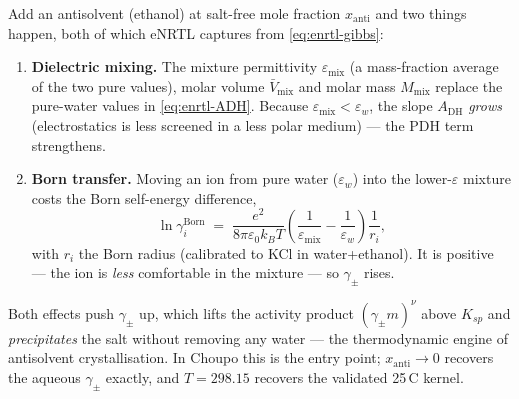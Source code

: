 \documentclass[11pt,a4paper]{article}
\begin{document}
Add an antisolvent (ethanol) at salt-free mole fraction $x_{\mathrm{anti}}$
and two things happen, both of which eNRTL captures from
\eqref{eq:enrtl-gibbs}:

\begin{enumerate}[leftmargin=*,nosep,topsep=2pt]
  \item \textbf{Dielectric mixing.}  The mixture permittivity
        $\varepsilon_{\mathrm{mix}}$ (a mass-fraction average of the two
        pure values), molar volume $\bar V_{\mathrm{mix}}$ and molar mass
        $M_{\mathrm{mix}}$ replace the pure-water values in
        \eqref{eq:enrtl-ADH}.  Because $\varepsilon_{\mathrm{mix}} <
        \varepsilon_w$, the slope $A_{\mathrm{DH}}$ \emph{grows} (electrostatics
        is less screened in a less polar medium) --- the PDH term
        strengthens.
  \item \textbf{Born transfer.}  Moving an ion from pure water
        ($\varepsilon_w$) into the lower-$\varepsilon$ mixture costs the
        Born self-energy difference,
        \begin{equation}
           \ln\gamma_i^{\mathrm{Born}}
           \;=\;
           \frac{e^{2}}{8\pi\varepsilon_0 k_B T}
           \left(\frac{1}{\varepsilon_{\mathrm{mix}}}
                - \frac{1}{\varepsilon_w}\right)\frac{1}{r_i},
           \label{eq:enrtl-born}
        \end{equation}
        with $r_i$ the Born radius (calibrated to KCl in water+ethanol).
        It is positive --- the ion is \emph{less} comfortable in the
        mixture --- so $\gamma_\pm$ rises.
\end{enumerate}

Both effects push $\gamma_\pm$ up, which lifts the activity product
$(\gamma_\pm m)^\nu$ above $K_{sp}$ and \emph{precipitates} the salt
without removing any water --- the thermodynamic engine of antisolvent
crystallisation.  In Choupo this is the  entry point;
$x_{\mathrm{anti}}\!\to\!0$ recovers the aqueous $\gamma_\pm$ exactly,
and $T\!=\!298.15$ recovers the validated 25\,\textdegree C kernel.
\end{document}
